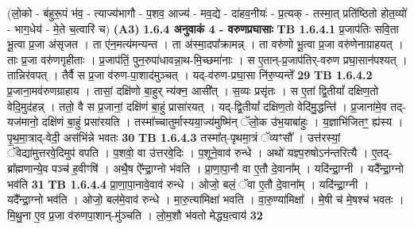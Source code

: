 \documentclass[17pt]{extarticle}
\begin{document}
                  \newline
                                    (लो॒को - ब॑हुरू॒पं भ॑व॒ - त्याज्य॑भागौ - प॒शव॒ आज्य॑ - मव॒द्ये - दा॑हव॒नीयः॑ - प्र॒त्यक् - तस्मा॒त् प्रति॑ष्ठितो होत॒व्यो॑ - भाग॒धेय॑ - मे॒ते च॒त्वारि॑ च) \textbf{(A3)} \newline \newline
                \textbf{ 1.6.4     अनुवाकं   4 - वरुणप्रघासाः} \newline
                                \textbf{ TB 1.6.4.1} \newline
                  प्र॒जाप॑तिः सवि॒ता भू॒त्वा प्र॒जा अ॑सृजत । ता ए॑न॒मत्य॑मन्यन्त । ता अ॑स्मा॒दपा᳚क्रामन्न् । ता वरु॑णो भू॒त्वा प्र॒जा वरु॑णेनाग्राहयत् । ताः प्र॒जा वरु॑णगृहीताः । प्र॒जाप॑तिं॒ पुन॒रुपा॑धावन्ना॒थ-मि॒च्छमा॑नाः । स ए॒तान्-प्र॒जाप॑तिर्-वरुण प्रघा॒सान॑पश्यत् । तान्निर॑वपत् । तैर्वै स प्र॒जा व॑रुण-पा॒शाद॑मुञ्चत् । यद्-व॑रुण-प्रघा॒सा नि॑रु॒प्यन्ते᳚ \textbf{ 29} \newline
                  \newline
                                \textbf{ TB 1.6.4.2} \newline
                  प्र॒जाना॒मव॑रुणग्राहाय । तासां॒ दक्षि॑णो बा॒हुर् न्य॑क्न॒ आसी᳚त् । स॒व्यः प्रसृ॑तः । स ए॒तां द्वि॒तीयां᳚ दक्षिण॒तो वेदि॒मुद॑हन्न् । ततो॒ वै स प्र॒जानां॒ दक्षि॑णं बा॒हुं प्रासा॑रयत् । यद्-द्वि॒तीयां᳚ दक्षिण॒तो वेदि॑मु॒द्धन्ति॑ । प्र॒जाना॑मे॒व तद्-यज॑मानो॒ दक्षि॑णं बा॒हुं प्रसा॑रयति । तस्मा᳚च्चातुर्मास्यया॒ज्य॑मुष्मि॑न् ॅलो॒क उ॑भ॒याबा॑हुः । य॒ज्ञाभि॑जितꣳ॒॒ ह्य॑स्य । पृ॒थ॒मा॒त्राद्-वेदी॒ अस॑भिंन्ने भवतः \textbf{ 30} \newline
                  \newline
                                \textbf{ TB 1.6.4.3} \newline
                  तस्मा᳚त्-पृथमा॒त्रं ॅव्यꣳसौ᳚ । उत्त॑रस्यां॒ ॅवेद्या॑मुत्तरवे॒दिमुप॑ वपति । प॒शवो॒ वा उ॑त्तरवे॒दिः । प॒शूने॒वाव॑ रुन्धे । अथो॑ यज्ञ्प॒रुषोऽन॑न्तरित्यै । ए॒तद्-ब्रा᳚ह्मणान्ये॒व पञ्च॑ ह॒वीꣳषि॑ । अथै॒ष ऐ᳚न्द्रा॒ग्नो भ॑वति । प्रा॒णा॒पा॒नौ वा ए॒तौ दे॒वाना᳚म् । यदि॑न्द्रा॒ग्नी । यदै᳚न्द्रा॒ग्नो भव॑ति \textbf{ 31} \newline
                  \newline
                                \textbf{ TB 1.6.4.4} \newline
                  प्रा॒णा॒पा॒नावे॒वाव॑ रुन्धे । ओजो॒ बलं॒ ॅवा ए॒तौ दे॒वाना᳚म् । यदि॑न्द्रा॒ग्नी । यदै᳚न्द्रा॒ग्नो भव॑ति । ओजो॒ बल॑मे॒वाव॑ रुन्धे । मा॒रु॒त्या॑मिक्षा॑ भवति । वा॒रु॒ण्या॑मिक्षा᳚ । मे॒षी च॑ मे॒षश्च॑ भवतः । मि॒थु॒ना ए॒व प्र॒जा व॑रुणपा॒शान्-मु॑ञ्चति । लो॒म॒शौ भ॑वतो मेद्ध्य॒त्वाय॑ \textbf{ 32} \newline
\end{document}
